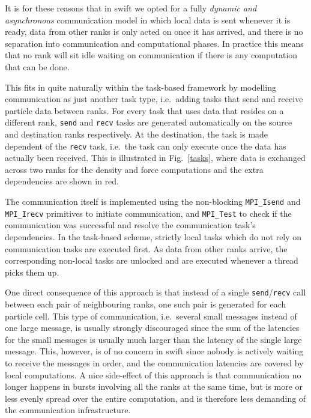 \documentclass{sig-alternate-05-2015}
\newcommand{\swift}{{\sc swift}\xspace}
\begin{document}
It is for these reasons that in \swift we opted for a fully
{\em dynamic and asynchronous} communication model in which local
data is sent whenever it is ready, data from other ranks is
only acted on once it has arrived, and there is no separation into
communication and computational phases.
In practice this means that no rank will sit idle waiting on
communication if there is any computation that can be done.

This fits in quite naturally within the task-based framework
by modelling communication as just another task type, i.e.~adding
tasks that send and receive particle data between ranks.
For every task that uses data that resides on a different rank,
{\tt send} and {\tt recv} tasks are generated automatically on the source
and destination ranks respectively.
At the destination, the task is made dependent of the {\tt recv}
task, i.e.~the task can only execute once the data has actually
been received.
This is illustrated in Fig.~\ref{tasks}, where data is exchanged across
two ranks for the density and force computations and the extra
dependencies are shown in red.

The communication itself is implemented using the non-blocking
{\tt MPI\_Isend} and {\tt MPI\_Irecv} primitives to initiate
communication, and {\tt MPI\_Test} to check if the communication was
successful and resolve the communication task's dependencies.  In the
task-based scheme, strictly local tasks which do not rely on
communication tasks are executed first.  As data from other ranks
arrive, the corresponding non-local tasks are unlocked and are
executed whenever a thread picks them up.

One direct consequence of this approach is that instead of a single
{\tt send}/{\tt recv} call between each pair of neighbouring ranks,
one such pair is generated for each particle cell.
This type of communication, i.e.~several small messages instead of
one large message, is usually strongly discouraged since the sum of
the latencies for the small messages is usually much larger than
the latency of the single large message.
This, however, is of no concern in \swift since nobody is actively
waiting to receive the messages in order, and the communication
latencies are covered by local computations.
A nice side-effect of this approach is that communication no longer
happens in bursts involving all the ranks at the same time, but
is more or less evenly spread over the entire computation, and is
therefore less demanding of the communication infrastructure.
\end{document}

